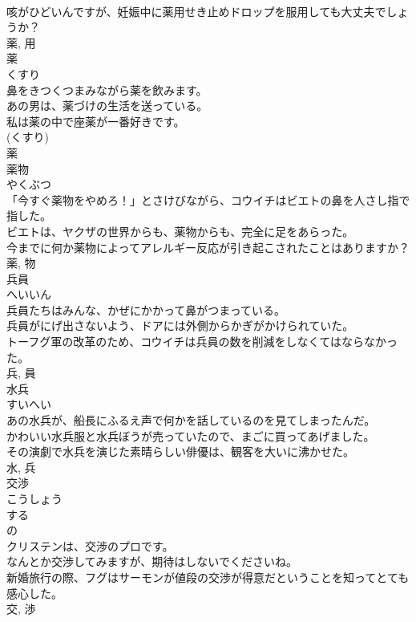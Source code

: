 \documentclass[8pt]{extreport}
\begin{document}
\begin{CJK}{UTF8}{min}
\\	咳がひどいんですが、妊娠中に薬用せき止めドロップを服用しても大丈夫でしょうか？	
\\	薬, 用	
\\	薬	
\\	くすり	
\\	鼻をきつくつまみながら薬を飲みます。	
\\	あの男は、薬づけの生活を送っている。	
\\	私は薬の中で座薬が一番好きです。	
\\	(くすり) 
\\	薬	
\\	薬物	
\\	やくぶつ	
\\	「今すぐ薬物をやめろ！」とさけびながら、コウイチはビエトの鼻を人さし指で指した。	
\\	ビエトは、ヤクザの世界からも、薬物からも、完全に足をあらった。	
\\	今までに何か薬物によってアレルギー反応が引き起こされたことはありますか？	
\\	薬, 物	
\\	兵員	
\\	へいいん	
\\	兵員たちはみんな、かぜにかかって鼻がつまっている。	
\\	兵員がにげ出さないよう、ドアには外側からかぎがかけられていた。	
\\	トーフグ軍の改革のため、コウイチは兵員の数を削減をしなくてはならなかった。	
\\	兵, 員	
\\	水兵	
\\	すいへい	
\\	あの水兵が、船長にふるえ声で何かを話しているのを見てしまったんだ。	
\\	かわいい水兵服と水兵ぼうが売っていたので、まごに買ってあげました。	
\\	その演劇で水兵を演じた素晴らしい俳優は、観客を大いに沸かせた。	
\\	水, 兵	
\\	交渉	
\\	こうしょう	
\\	する 
\\	の 
\\	クリステンは、交渉のプロです。	
\\	なんとか交渉してみますが、期待はしないでくださいね。	
\\	新婚旅行の際、フグはサーモンが値段の交渉が得意だということを知ってとても感心した。	
\\	交, 渉	

\end{CJK}
\end{document}
